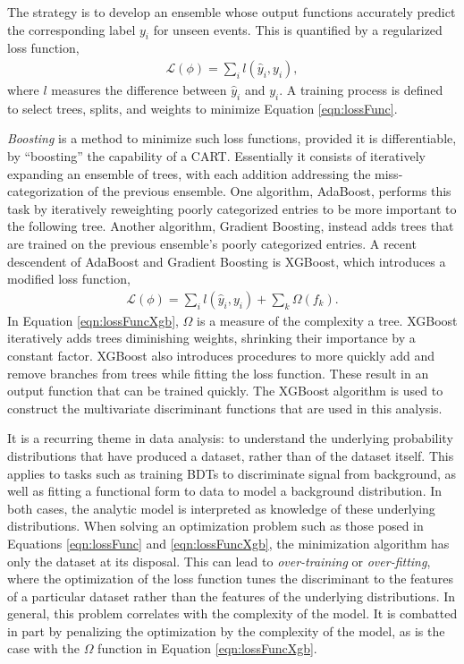 The strategy is to develop an ensemble whose output functions accurately predict the corresponding label $y_i$ for unseen events.
This is quantified by a regularized loss function,
\begin{equation}\begin{split}\label{eqn:lossFunc}
    \mathcal{L}(\phi)=\sum_i l(\hat{y}_i,y_i),
\end{split}\end{equation} 
where $l$ measures the difference between $\hat{y}_i$ and $y_i$.
A training process is defined to select trees, splits, and weights to minimize Equation \ref{eqn:lossFunc}.

\emph{Boosting} is a method to minimize such loss functions, provided it is differentiable, by ``boosting'' the capability of a CART.
Essentially it consists of iteratively expanding an ensemble of trees, with each addition addressing the miss-categorization of the previous ensemble.
One algorithm, AdaBoost, performs this task by iteratively reweighting poorly categorized entries to be more important to the following tree.
Another algorithm, Gradient Boosting, instead adds trees that are trained on the previous ensemble's poorly categorized entries.
A recent descendent of AdaBoost and Gradient Boosting is XGBoost, which introduces a modified loss function,
\begin{equation}\begin{split}\label{eqn:lossFuncXgb}
    \mathcal{L}(\phi)=\sum_i l(\hat{y}_i,y_i)+\sum_k \Omega(f_k).
\end{split}\end{equation} 
In Equation \ref{eqn:lossFuncXgb}, $\Omega$ is a measure of the complexity a tree.
XGBoost iteratively adds trees diminishing weights, shrinking their importance by a constant factor.
XGBoost also introduces procedures to more quickly add and remove branches from trees while fitting the loss function.
These result in an output function that can be trained quickly.
The XGBoost algorithm is used to construct the multivariate discriminant functions that are used in this analysis.
\cite{xgboost}

It is a recurring theme in data analysis: to understand the underlying probability distributions that have produced a dataset, rather than of the dataset itself.
This applies to tasks such as training BDTs to discriminate signal from background, as well as fitting a functional form to data to model a background distribution. 
In both cases, the analytic model is interpreted as knowledge of these underlying distributions.
When solving an optimization problem such as those posed in Equations \ref{eqn:lossFunc} and \ref{eqn:lossFuncXgb}, the minimization algorithm has only the dataset at its disposal.
This can lead to \emph{over-training} or \emph{over-fitting}, where the optimization of the loss function tunes the discriminant to the features of a particular dataset rather than the features of the underlying distributions.
In general, this problem correlates with the complexity of the model.
It is combatted in part by penalizing the optimization by the complexity of the model, as is the case with the $\Omega$ function in Equation \ref{eqn:lossFuncXgb}.

